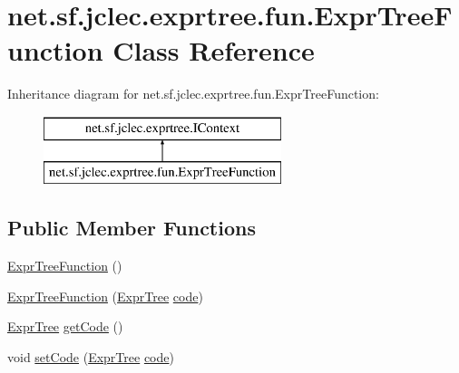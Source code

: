 \hypertarget{classnet_1_1sf_1_1jclec_1_1exprtree_1_1fun_1_1_expr_tree_function}{\section{net.\-sf.\-jclec.\-exprtree.\-fun.\-Expr\-Tree\-Function Class Reference}
\label{classnet_1_1sf_1_1jclec_1_1exprtree_1_1fun_1_1_expr_tree_function}
}
Inheritance diagram for net.\-sf.\-jclec.\-exprtree.\-fun.\-Expr\-Tree\-Function\-:\begin{figure}[H]
\begin{center}
\leavevmode
\includegraphics[height=2.000000cm]{classnet_1_1sf_1_1jclec_1_1exprtree_1_1fun_1_1_expr_tree_function}
\end{center}
\end{figure}
\subsection*{Public Member Functions}
\begin{DoxyCompactItemize}
\item 
\hyperlink{classnet_1_1sf_1_1jclec_1_1exprtree_1_1fun_1_1_expr_tree_function_a5466bce31de5c7bfeba0135881074368}{Expr\-Tree\-Function} ()
\item 
\hyperlink{classnet_1_1sf_1_1jclec_1_1exprtree_1_1fun_1_1_expr_tree_function_a15f7749f19ecb2eb46a83f6e286b1194}{Expr\-Tree\-Function} (\hyperlink{classnet_1_1sf_1_1jclec_1_1exprtree_1_1_expr_tree}{Expr\-Tree} \hyperlink{classnet_1_1sf_1_1jclec_1_1exprtree_1_1fun_1_1_expr_tree_function_a148bc528b69b2c629888767cc5e9adbc}{code})
\item 
\hyperlink{classnet_1_1sf_1_1jclec_1_1exprtree_1_1_expr_tree}{Expr\-Tree} \hyperlink{classnet_1_1sf_1_1jclec_1_1exprtree_1_1fun_1_1_expr_tree_function_ab3e0d6e96614c14b5d57a904c1297f50}{get\-Code} ()
\item 
void \hyperlink{classnet_1_1sf_1_1jclec_1_1exprtree_1_1fun_1_1_expr_tree_function_ae5efd1c619720855ca51de3b5d710ca2}{set\-Code} (\hyperlink{classnet_1_1sf_1_1jclec_1_1exprtree_1_1_expr_tree}{Expr\-Tree} \hyperlink{classnet_1_1sf_1_1jclec_1_1exprtree_1_1fun_1_1_expr_tree_function_a148bc528b69b2c629888767cc5e9adbc}{code})
\end{DoxyCompactItemize}
